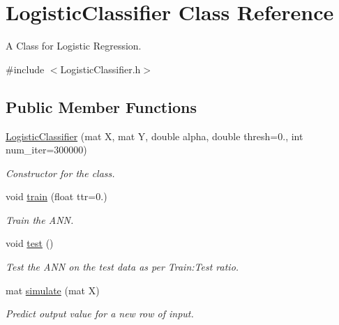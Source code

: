 \hypertarget{classLogisticClassifier}{}\section{Logistic\+Classifier Class Reference}
\label{classLogisticClassifier}


A Class for Logistic Regression.  




{\ttfamily \#include $<$Logistic\+Classifier.\+h$>$}

\subsection*{Public Member Functions}
\begin{DoxyCompactItemize}
\item 
\hyperlink{classLogisticClassifier_ad09081f432b7290fd38f82e2b63331ad}{Logistic\+Classifier} (mat X, mat Y, double alpha, double thresh=0., int num\+\_\+iter=300000)
\begin{DoxyCompactList}\small\item\em Constructor for the class. \end{DoxyCompactList}\item 
void \hyperlink{classLogisticClassifier_a77c2b290fe81dbbcf4f34c4ca3568681}{train} (float ttr=0.)
\begin{DoxyCompactList}\small\item\em Train the A\+NN. \end{DoxyCompactList}\item 
\mbox{\label{classLogisticClassifier_ad2a4beb7b3c5dfa7ac9aed38db89a692}} 
void \hyperlink{classLogisticClassifier_ad2a4beb7b3c5dfa7ac9aed38db89a692}{test} ()
\begin{DoxyCompactList}\small\item\em Test the A\+NN on the test data as per Train\+:Test ratio. \end{DoxyCompactList}\item 
\mbox{\label{classLogisticClassifier_a88992ed0aacc53c2613cb2dfcf584286}} 
mat \hyperlink{classLogisticClassifier_a88992ed0aacc53c2613cb2dfcf584286}{simulate} (mat X)
\begin{DoxyCompactList}\small\item\em Predict output value for a new row of input. \end{DoxyCompactList}\item 

\end{DoxyCompactItemize}

